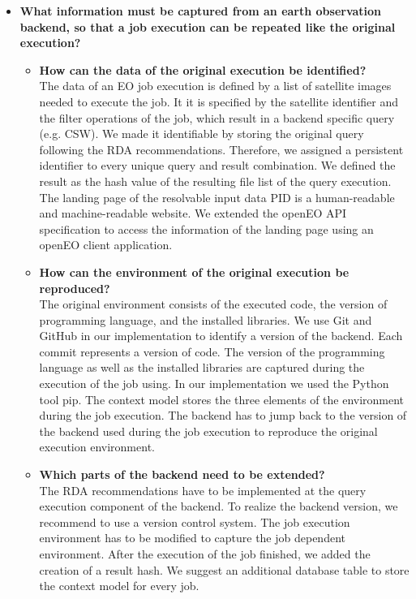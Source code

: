 \documentclass[draft,final]{vutinfth} %
\newcommand{\bgoesswe}[1]{#1}
\begin{document}
\begin{itemize}
	\item \textbf{What information must be captured from an earth observation backend, so that a job execution can be repeated like the original execution?}
	\begin{itemize}
		\item \textbf{How can the data of the original execution be identified?} \\
		\bgoesswe{The data of an EO job execution is defined by a list of satellite images needed to execute the job. It it is specified by the satellite identifier and the filter operations of the job, which result in a backend specific query (e.g. CSW). We made it} identifiable by storing the original query following the RDA recommendations. Therefore, we assigned a persistent identifier to every unique query and result combination. We defined the result as the hash value of the resulting file list of the query execution. The landing page of the resolvable input data PID is a human-readable and machine-readable website. \bgoesswe{We extended the openEO API specification to access the information of the landing page using an openEO client application.}
		\item \textbf{How can the environment of the original execution be reproduced?} \\
		The original environment consists of the \bgoesswe{executed} code, the version of programming language, and the installed libraries. We use Git and GitHub in our implementation to identify a version of the backend. \bgoesswe{Each commit represents a version of code.} \bgoesswe{The version of the programming language as well as the installed libraries are captured during the execution of the job using. In our implementation we used the Python tool pip. The context model stores the three elements of the environment during the job execution.} The backend has to jump back to the version of the backend used during the job execution to reproduce the original execution environment.       
		\item \textbf{Which parts of the backend need to be extended?} \\
		The RDA recommendations have to be implemented at the query execution component of the backend. To realize the backend version, we recommend to use a version control system. The job execution environment has to be modified to capture the job dependent environment. After the execution of the job finished, we added the creation of a result hash. We suggest an additional database table to store the context model for every job.

\end{itemize}
\end{itemize}
\end{document}
